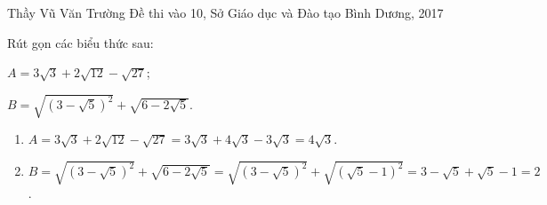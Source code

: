  
\begin{name}
{Thầy  Vũ Văn Trường}
{Đề thi vào 10, Sở Giáo dục và Đào tạo Bình Dương, 2017}
\end{name}
\setcounter{ex}{0}
\begin{ex}%
Rút gọn các biểu thức sau:
    \hfill
    \begin{enumerate}[1)]
        \begin{multicols}{2}
        \item $A=3\sqrt{3}+2\sqrt{12}-\sqrt{27}$;	
        \item $B=\sqrt{{{(3-\sqrt{5})}^{2}}}+\sqrt{6-2\sqrt{5}}$.
    	\end{multicols}
    \end{enumerate}
\loigiai
    {
    \begin{enumerate}[1)]
        \item $A=3\sqrt{3}+2\sqrt{12}-\sqrt{27}=3\sqrt{3}+4\sqrt{3}-3\sqrt{3}=4\sqrt{3}$.
        \item $B=\sqrt{\left(3-\sqrt{5} \right)^2}+\sqrt{6-2\sqrt{5}}=\sqrt{\left(3-\sqrt{5} \right)^2}+\sqrt{(\sqrt{5}-1)^2}=3-\sqrt{5}+\sqrt{5}-1=2$.
    \end{enumerate}
    }
\end{ex}

